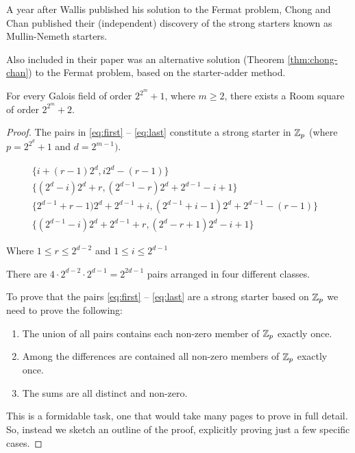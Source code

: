 A year after Wallis published his solution to the Fermat problem, Chong and Chan published their (independent) discovery of the strong starters known as Mullin-Nemeth starters.

Also included in their paper was an alternative solution (Theorem \ref{thm:chong-chan}) to the Fermat problem, based on the starter-adder method.

\begin{theorem}
\label{thm:chong-chan}
For every Galois field of order $2^{2^m} + 1$, where $m \geq 2$, there exists a Room square of order $2^{2^m} + 2$.
\end{theorem}

\begin{proof}
The pairs in \eqref{eq:first} -- \eqref{eq:last} constitute a strong starter in $\mathbb{Z}_{p}$ (where $p = 2^{2^d} + 1$ and $d = 2^{m - 1})$.

\begin{align}
  \{i + (r - 1)2^d, i2^d - (r - 1)\} & \label{eq:first} \\
  \{(2^d - i)2^d + r, (2^{d - 1} - r)2^d + 2^{d - 1} - i + 1\} & \\
  \{2^{d-1} + r - 1)2^d + 2^{d - 1} + i, (2^{d - 1} + i - 1)2^d + 2^{d - 1} - (r - 1)\} & \\
  \{(2^{d-1}-i)2^d+2^{d-1}+r,(2^d-r+1)2^d-i+1\} & \label{eq:last}
\end{align}

Where $1 \leq r \leq 2^{d - 2}$ and $1 \leq i \leq 2^{d-1}$

There are $4 \cdot 2^{d - 2} \cdot 2^{d - 1} = 2^{2d - 1}$ pairs arranged in four different classes.

To prove that the pairs \eqref{eq:first} -- \eqref{eq:last} are a strong starter based on $\mathbb{Z}_{p}$ we need to prove the following:

\begin{enumerate}
  \item{\label{item:union} The union of all pairs contains each non-zero member of $\mathbb{Z}_{p}$ exactly once.}
  \item{\label{item:differences} Among the differences are contained all non-zero members of $\mathbb{Z}_{p}$ exactly once.}
  \item{\label{item:sum} The sums are all distinct and non-zero.}
\end{enumerate}

This is a formidable task, one that would take many pages to prove in full detail.
So, instead we sketch an outline of the proof, explicitly proving just a few specific cases.


\end{proof}
